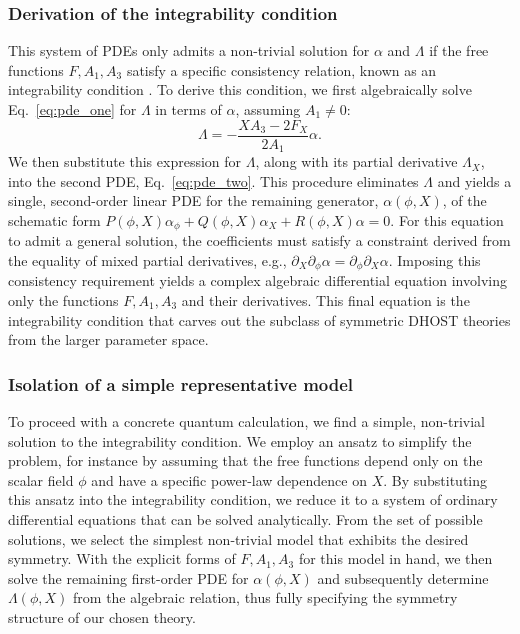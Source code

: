 \documentclass[twocolumn]{aastex631}
\begin{document}
\subsubsection{Derivation of the integrability condition}
This system of PDEs only admits a non-trivial solution for $\alpha$ and $\Lambda$ if the free functions $F, A_1, A_3$ satisfy a specific consistency relation, known as an integrability condition \citep{papachristou2019aspectsintegrabilitydifferentialsystems}. To derive this condition, we first algebraically solve Eq.~\eqref{eq:pde_one} for $\Lambda$ in terms of $\alpha$, assuming $A_1 \neq 0$:
\begin{equation}\Lambda = - \frac{X A_3 - 2 F_X}{2 A_1} \alpha.\end{equation}
We then substitute this expression for $\Lambda$, along with its partial derivative $\Lambda_X$, into the second PDE, Eq.~\eqref{eq:pde_two}. This procedure eliminates $\Lambda$ and yields a single, second-order linear PDE for the remaining generator, $\alpha(\phi, X)$, of the schematic form $P(\phi,X) \alpha_\phi + Q(\phi,X) \alpha_X + R(\phi,X) \alpha = 0$. For this equation to admit a general solution, the coefficients must satisfy a constraint derived from the equality of mixed partial derivatives, e.g., $\partial_X \partial_\phi \alpha = \partial_\phi \partial_X \alpha$. Imposing this consistency requirement yields a complex algebraic differential equation involving only the functions $F, A_1, A_3$ and their derivatives. This final equation is the integrability condition that carves out the subclass of symmetric DHOST theories from the larger parameter space.

\subsubsection{Isolation of a simple representative model}
To proceed with a concrete quantum calculation, we find a simple, non-trivial solution to the integrability condition. We employ an ansatz to simplify the problem, for instance by assuming that the free functions depend only on the scalar field $\phi$ and have a specific power-law dependence on $X$. By substituting this ansatz into the integrability condition, we reduce it to a system of ordinary differential equations that can be solved analytically. From the set of possible solutions, we select the simplest non-trivial model that exhibits the desired symmetry. With the explicit forms of $F, A_1, A_3$ for this model in hand, we then solve the remaining first-order PDE for $\alpha(\phi, X)$ and subsequently determine $\Lambda(\phi, X)$ from the algebraic relation, thus fully specifying the symmetry structure of our chosen theory.
\end{document}
